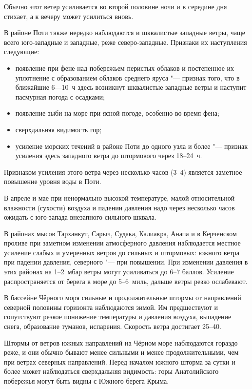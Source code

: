Обычно этот ветер усиливается во второй половине ночи и в середине дня
стихает, а к вечеру может усилиться вновь.

В районе Поти также нередко наблюдаются и шквалистые западные ветры,
чаще всего юго-западные и западные, реже северо-западные. Признаки их наступления следующие:
\begin{itemize}
\item появление при фене над побережьем перистых облаков и постепенное
  их уплотнение с образованием облаков среднего яруса "--- признак
  того, что в ближайшие 6---10~ч здесь возникнут шквалистые западные
  ветры и наступит пасмурная погода с осадками;
\item появление зыби на море при ясной погоде, особенно во время фена;
\item сверхдальняя видимость гор;
\item усиление морских течений в районе Поти до одного узла и более
  "--- признак усиления здесь западного ветра до штормового через
  18--24~ч.
\end{itemize}

Признаком усиления этого ветра через несколько часов (3--4) является
заметное повышение уровня воды в Поти.

В апреле и мае при ненормально высокой температуре, малой
относительной влажности (сухости) воздуха и падении давления надо
через несколько часов ожидать с юго-запада внезапного сильного шквала.

В районах мысов Тарханкут, Сарыч, Судака, Калиакра, Анапа и в
Керченском проливе при заметном изменении атмосферного давления
наблюдается местное усиление слабых и умеренных ветров до сильных и
штормовых: южного ветра при падении давления, северного "--- при
повышении. При изменении давления в этих районах на 1--2~мбар ветры
могут усиливаться до 6--7 баллов. Усиление распространяется от берега в
море до 5--6~миль, дальше ветры резко ослабевают.

В бассейне Чёрного моря сильные и продолжительные штормы от
направлений северной половины горизонта наблюдаются зимой. Им
предшествуют и сопутствуют резкое понижение температуры и давления
воздуха, выпадение снега, образование туманов, испарения. Скорость
ветра достигает 25--40\speedms.

Штормы от ветров южных направлений на Чёрном море наблюдаются гораздо
реже, и они обычно бывают менее сильными и менее продолжительными, чем
при ветрах северных направлений. Перед началом южного шторма за сутки
и более может наблюдаться сверхдальняя видимость: горы Анатолийского
побережья могут быть видны с Южного берега Крыма.

